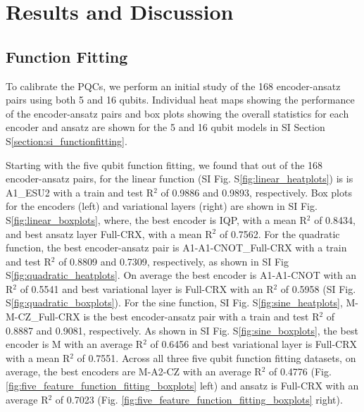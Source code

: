 \documentclass[journal=jacsat,manuscript=article]{achemso}
\newcommand{\siref}[1]{S\ref{#1}}
\begin{document}
\section{Results and Discussion}
\label{section:results_and_discussion}

\subsection{Function Fitting}
To calibrate the PQCs, we perform an initial study of the 168 encoder-ansatz pairs using both 5 and 16 qubits.
Individual heat maps showing the performance of the encoder-ansatz pairs and box plots showing the overall statistics for each encoder and ansatz are shown for the 5 and 16 qubit models in SI Section \siref{section:si_functionfitting}.


Starting with the five qubit function fitting, we found that out of the
168 encoder-ansatz pairs, for the linear function (SI Fig. \siref{fig:linear_heatplots}) is is A1\_ESU2 with a train and test R$^{2}$ of 0.9886 and 0.9893, respectively.
Box plots for the encoders (left) and variational layers (right) are shown in SI  Fig. \siref{fig:linear_boxplots}, where, the best encoder is IQP, with a mean R$^{2}$ of 0.8434, and best ansatz layer Full-CRX, with a mean R$^{2}$ of 0.7562.
For the quadratic function, the best encoder-ansatz pair is A1-A1-CNOT\_Full-CRX with a train and test R$^{2}$ of 0.8809 and 0.7309, respectively, as shown in SI Fig \siref{fig:quadratic_heatplots}.
On average the best encoder is A1-A1-CNOT with an R$^{2}$ of 0.5541 and best variational layer is Full-CRX with an R$^{2}$ of 0.5958 (SI  Fig. \siref{fig:quadratic_boxplots}).
For the sine function, SI  Fig. \siref{fig:sine_heatplots}, M-M-CZ\_Full-CRX is the best encoder-ansatz pair with a train and test R$^{2}$ of 0.8887 and 0.9081, respectively.
As shown in SI  Fig. \siref{fig:sine_boxplots}, the best encoder is M with an average R$^{2}$ of 0.6456 and best variational layer is Full-CRX with a mean R$^{2}$ of 0.7551.
Across all three five qubit function fitting datasets, on average, the best encoders are M-A2-CZ with an average R$^{2}$ of 0.4776 (Fig. \ref{fig:five_feature_function_fitting_boxplots} left) and ansatz is Full-CRX with an average R$^{2}$ of 0.7023 (Fig. \ref{fig:five_feature_function_fitting_boxplots} right).
\end{document}
